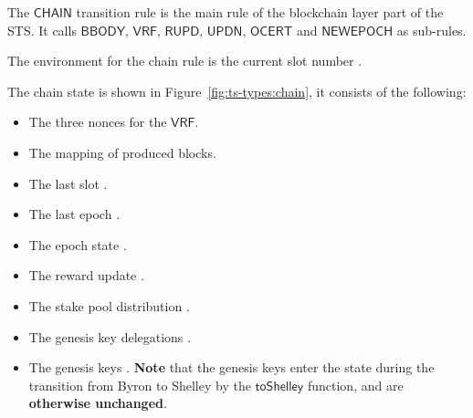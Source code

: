 The $\mathsf{CHAIN}$ transition rule is the main rule of the blockchain layer
part of the STS. It calls $\mathsf{BBODY}$, $\mathsf{VRF}$, $\mathsf{RUPD}$,
$\mathsf{UPDN}$, $\mathsf{OCERT}$ and $\mathsf{NEWEPOCH}$ as sub-rules.

The environment for the chain rule is the current slot number .

The chain state is shown in Figure~\ref{fig:ts-types:chain}, it consists of the
following:

\begin{itemize}
\item The three nonces for the $\mathsf{VRF}$.
\item The mapping of produced blocks.
\item The last slot .
\item The last epoch .
\item The epoch state .
\item The reward update .
\item The stake pool distribution .
\item The genesis key delegations .
\item The genesis keys .
  \textbf{Note} that the genesis keys enter the state during the transition
  from Byron to Shelley by the $\mathsf{toShelley}$ function, and are \textbf{otherwise unchanged}.
\end{itemize}


